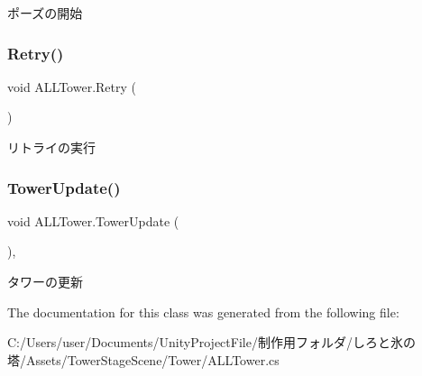 ポーズの開始 

\mbox{\label{class_a_l_l_tower_a30b3b152a1444c0dd1f326ff4d4f6ede}} 
\subsubsection{\texorpdfstring{Retry()}{Retry()}}
{\footnotesize\ttfamily void A\+L\+L\+Tower.\+Retry (\begin{DoxyParamCaption}{ }\end{DoxyParamCaption})\hspace{0.3cm}{\ttfamily [inline]}}



リトライの実行 

\mbox{\label{class_a_l_l_tower_aed8435a5e40b07b3b6a88d0ad08e7904}} 
\subsubsection{\texorpdfstring{Tower\+Update()}{TowerUpdate()}}
{\footnotesize\ttfamily void A\+L\+L\+Tower.\+Tower\+Update (\begin{DoxyParamCaption}{ }\end{DoxyParamCaption})\hspace{0.3cm}{\ttfamily [inline]}, {\ttfamily [private]}}



タワーの更新 



The documentation for this class was generated from the following file\+:\begin{DoxyCompactItemize}
\item 
C\+:/\+Users/user/\+Documents/\+Unity\+Project\+File/制作用フォルダ/しろと氷の塔/\+Assets/\+Tower\+Stage\+Scene/\+Tower/A\+L\+L\+Tower.\+cs\end{DoxyCompactItemize}
